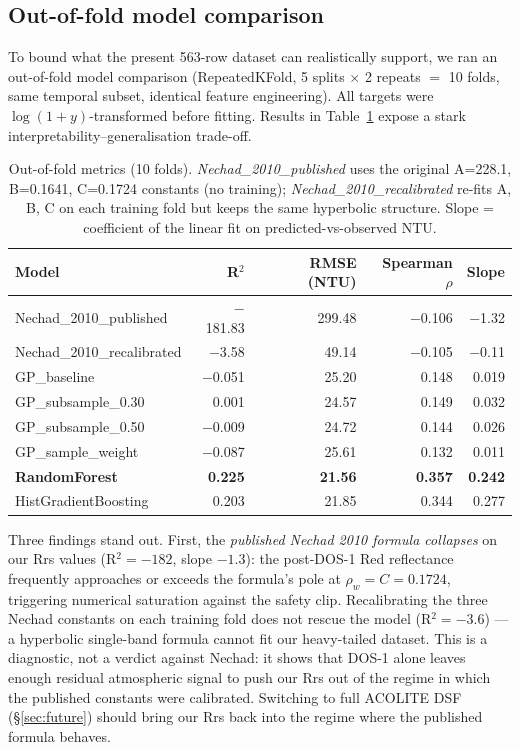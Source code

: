 \documentclass[11pt,a4paper]{article}
\begin{document}
\subsection{Out-of-fold model comparison}
\label{sec:compare}
To bound what the present 563-row dataset can realistically support, we ran an out-of-fold model comparison (RepeatedKFold, 5 splits $\times$ 2 repeats $=$ 10 folds, same temporal subset, identical feature engineering). All targets were $\log(1+y)$-transformed before fitting. Results in Table~\ref{tab:modelcompare} expose a stark interpretability--generalisation trade-off.

\begin{table}[h]
\centering
\caption{Out-of-fold metrics (10 folds). \emph{Nechad\_2010\_published} uses the original A=228.1, B=0.1641, C=0.1724 constants (no training); \emph{Nechad\_2010\_recalibrated} re-fits A, B, C on each training fold but keeps the same hyperbolic structure. Slope = coefficient of the linear fit on predicted-vs-observed NTU.}
\label{tab:modelcompare}
\small
\begin{tabular}{lrrrr}
\toprule
Model & R$^2$ & RMSE (NTU) & Spearman $\rho$ & Slope \\
\midrule
Nechad\_2010\_published    & $-$181.83 & 299.48 & $-$0.106 & $-$1.32 \\
Nechad\_2010\_recalibrated &   $-$3.58 &  49.14 & $-$0.105 & $-$0.11 \\
GP\_baseline               & $-$0.051 & 25.20 & 0.148 & 0.019 \\
GP\_subsample\_0.30        &  \phantom{$-$}0.001 & 24.57 & 0.149 & 0.032 \\
GP\_subsample\_0.50        & $-$0.009 & 24.72 & 0.144 & 0.026 \\
GP\_sample\_weight         & $-$0.087 & 25.61 & 0.132 & 0.011 \\
\textbf{RandomForest}      & \textbf{\phantom{$-$}0.225} & \textbf{21.56} & \textbf{0.357} & \textbf{0.242} \\
HistGradientBoosting       &  \phantom{$-$}0.203 & 21.85 & 0.344 & 0.277 \\
\bottomrule
\end{tabular}
\end{table}

Three findings stand out. First, the \emph{published Nechad 2010 formula collapses} on our Rrs values (R$^2 = -182$, slope $-1.3$): the post-DOS-1 Red reflectance frequently approaches or exceeds the formula's pole at $\rho_w = C = 0.1724$, triggering numerical saturation against the safety clip. Recalibrating the three Nechad constants on each training fold does not rescue the model (R$^2 = -3.6$) --- a hyperbolic single-band formula cannot fit our heavy-tailed dataset. This is a diagnostic, not a verdict against Nechad: it shows that DOS-1 alone leaves enough residual atmospheric signal to push our Rrs out of the regime in which the published constants were calibrated. Switching to full ACOLITE DSF (\S\ref{sec:future}) should bring our Rrs back into the regime where the published formula behaves.
\end{document}
